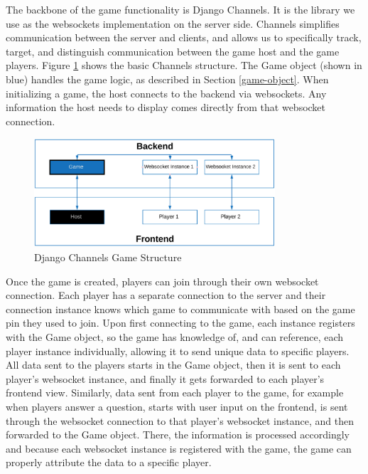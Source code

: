 \documentclass{article}
\begin{document}
	        The backbone of the game functionality is Django Channels. It is the library we use as the websockets implementation on the server side. Channels simplifies communication between the server and clients, and allows us to specifically track, target, and distinguish communication between the game host and the game players. Figure \ref{fig:backend-libraries_channels} shows the basic Channels structure. The Game object (shown in blue) handles the game logic, as described in Section \ref{game-object}.  When initializing a game, the host connects to the backend via websockets. Any information the host needs to display comes directly from that websocket connection.

            \begin{figure}[ht]
                \centering
                \includegraphics[width=0.8\textwidth]{images/backend-libraries_channels.png}
                \caption{Django Channels Game Structure}
                \label{fig:backend-libraries_channels}
            \end{figure}
            
	        Once the game is created, players can join through their own websocket connection. Each player has a separate connection to the server and their connection instance knows which game to communicate with based on the game pin they used to join. Upon first connecting to the game, each instance registers with the Game object, so the game has knowledge of, and can reference, each player instance individually, allowing it to send unique data to specific players. All data sent to the players starts in the Game object, then it is sent to each player's websocket instance, and finally it gets forwarded to each player's frontend view. Similarly, data sent from each player to the game, for example when players answer a question, starts with user input on the frontend, is sent through the websocket connection to that player's websocket instance, and then forwarded to the Game object. There, the information is processed accordingly and because each websocket instance is registered with the game, the game can properly attribute the data to a specific player.
	        \smallskip
	        
\end{document}
